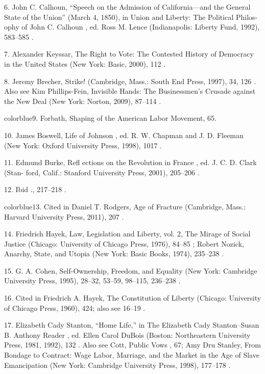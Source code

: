 	{\color{blue}6}. John C. Calhoun, “Speech on the Admission of California—and the General State of the Union” (March 4, 1850), in Union and Liberty: The Political Philos- ophy of John C. Calhoun , ed. Ross M. Lence (Indianapolis: Liberty Fund, 1992), 583–585 .


	{\color{blue}7}. Alexander Keyssar, The Right to Vote: The Contested History of Democracy in the United States (New York: Basic, 2000), 112 .


	{\color{blue}8}. Jeremy Brecher, Strike! (Cambridge, Mass.: South End Press, 1997), 34, 126 . Also see Kim Phillips-Fein, Invisible Hands: The Businessmen’s Crusade against the New Deal (New York: Norton, 2009), 87–114 .


	{color{blue}9}. Forbath, Shaping of the American Labor Movement, 65.


	{\color{blue}10}. James Boswell, Life of Johnson , ed. R. W. Chapman and J. D. Fleeman (New York: Oxford University Press, 1998), 1017 .


	{\color{blue}11}. Edmund Burke, Refl ections on the Revolution in France , ed. J. C. D. Clark (Stan- ford, Calif.: Stanford University Press, 2001), 205–206 .


	{\color{blue}12}. Ibid ., 217–218 .


	{color{blue}13}. Cited in Daniel T. Rodgers, Age of Fracture (Cambridge, Mass.: Harvard University Press, 2011), 207 .


	{\color{blue}14}. Friedrich Hayek, Law, Legislation and Liberty, vol. 2, The Mirage of Social Justice (Chicago: University of Chicago Press, 1976), 84–85 ; Robert Nozick, Anarchy, State, and Utopia (New York: Basic Books, 1974), 235–238 .


	{\color{blue}15}. G. A. Cohen, Self-Ownership, Freedom, and Equality (New York: Cambridge University Press, 1995), 28–32, 53–59, 98–115, 236–238 .


	{\color{blue}16}. Cited in Friedrich A. Hayek, The Constitution of Liberty (Chicago: University of Chicago Press, 1960), 424; also see 16–19 .


	{\color{blue}17}. Elizabeth Cady Stanton, “Home Life,” in The Elizabeth Cady Stanton–Susan B. Anthony Reader , ed. Ellen Carol DuBois (Boston: Northeastern University Press, 1981, 1992), 132 . Also see Cott, Public Vows , 67; Amy Dru Stanley, From Bondage to Contract: Wage Labor, Marriage, and the Market in the Age of Slave Emancipation (New York: Cambridge University Press, 1998), 177–178 .


